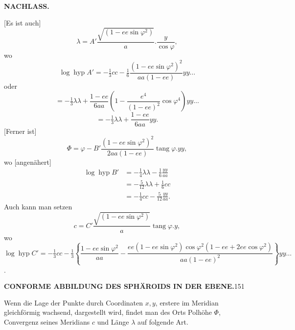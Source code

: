 \par\clearpage
{}\hfill{\small\textbf{NACHLASS.}}\hfill\null\par\medskip
{\centering [4.]\par}
[Es ist auch]
\[\lambda=A'\frac{\sqrt{(1-ee\sin\varphi^2)}}a.\frac y{\cos\varphi},\]
\noindent wo
\[\log\operatorname{hyp}A'=-\tfrac13cc-\tfrac16\frac{(1-ee\sin\varphi^2)^2}{aa(1-ee)}yy\ldots\]
\noindent oder
\[=-\tfrac13\lambda\lambda+\frac{1-ee}{6aa}\left(1-\frac{e^4}{(1-ee)^2}\cos\varphi^4\right)yy\ldots\]
\[=-\tfrac13\lambda\lambda+\frac{1-ee}{6aa}yy.\]
[Ferner ist]
\[\Phi=\varphi-B'\frac{(1-ee\sin\varphi^2)^2}{2aa(1-ee)}\operatorname{tang}\varphi.yy,\]
\noindent wo [angenähert]
\[
\begin{aligned}
\log\operatorname{hyp}B'&=-\tfrac14\lambda\lambda-\tfrac16\frac{yy}{aa}\\
&=-\tfrac5{12}\lambda\lambda+\tfrac16cc\\
&=-\tfrac14cc-\tfrac5{12}\frac{yy}{aa}.
\end{aligned}
\]
Auch kann man setzen
\[c=C'\frac{\sqrt{(1-ee\sin\varphi^2)}}a\operatorname{tang}\varphi.y,\]
\noindent wo
\[
\log\operatorname{hyp}C'=-\tfrac13cc-\tfrac13\left\{\frac{1-ee\sin\varphi^2}{aa}-\frac{ee(1-ee\sin\varphi^2)\cos\varphi^2(1-ee+2ee\cos\varphi^2)}{aa(1-ee)^2}\right\}yy\ldots
\]
.\]

\par\clearpage
\noindent\null\hfill{\small\textbf{CONFORME ABBILDUNG DES SPHÄROIDS IN DER EBENE.}}\hfill151\par\medskip
{\centering [5.]\par}
Wenn die Lage der Punkte durch Coordinaten \(x,y\), erstere im Meridian gleichförmig wachsend, dargestellt wird, findet man des Orts Polhöhe \(\Phi\), Convergenz seines Meridians \(c\) und Länge \(\lambda\) auf folgende Art.

